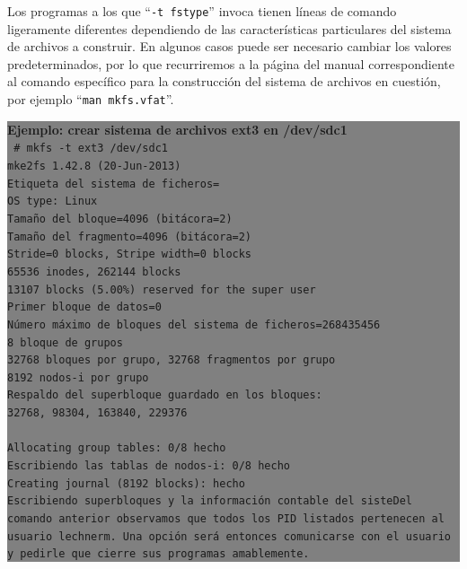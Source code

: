 \documentclass[12pt]{article}
\begin{document}
Los programas a los que ``\texttt{-t fstype}'' invoca tienen líneas de 
comando ligeramente diferentes dependiendo de las características 
particulares del sistema de archivos a construir. En algunos casos 
puede ser necesario cambiar los valores predeterminados, por lo que 
recurriremos a la página del manual correspondiente al comando específico 
para la construcción del sistema de archivos en cuestión, por ejemplo 
``\texttt{man mkfs.vfat}''.  


\colorbox{grey}{\parbox[t]{0.95\linewidth}{ \vspace*{0.5cm} { 
{\bf Ejemplo: crear sistema de archivos ext3 en /dev/sdc1 }\\
{\tt
\# mkfs -t ext3 /dev/sdc1\\
mke2fs 1.42.8 (20-Jun-2013)\\
Etiqueta del sistema de ficheros=\\
OS type: Linux\\
Tamaño del bloque=4096 (bitácora=2)\\
Tamaño del fragmento=4096 (bitácora=2)\\
Stride=0 blocks, Stripe width=0 blocks\\
65536 inodes, 262144 blocks\\
13107 blocks (5.00\%) reserved for the super user\\
Primer bloque de datos=0\\
Número máximo de bloques del sistema de ficheros=268435456\\
8 bloque de grupos\\
32768 bloques por grupo, 32768 fragmentos por grupo\\
8192 nodos-i por grupo\\
Respaldo del superbloque guardado en los bloques: \\
	32768, 98304, 163840, 229376\\
\\
Allocating group tables: 0/8   hecho                           \\
Escribiendo las tablas de nodos-i: 0/8 hecho                           \\
Creating journal (8192 blocks): hecho\\
Escribiendo superbloques y la información contable del sisteDel comando anterior observamos que todos los PID listados pertenecen al 
usuario lechnerm. Una opción será entonces comunicarse con el usuario y 
pedirle que cierre sus programas amablemente. }
} \vspace*{0.5cm} } } 
\end{document}
